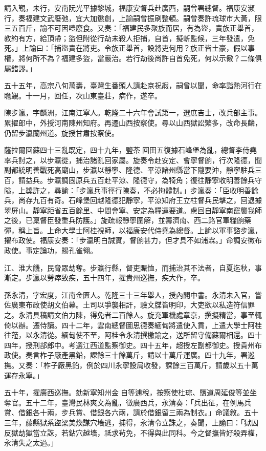 \begin{pinyinscope}
請入覲，未行，安南阮光平據黎城，福康安督兵赴廣西，嗣曾署總督。福康安瀕行，奏福建文武廢弛，宜大加懲創，上諭嗣曾振刷整頓。嗣曾奏許琉球市大黃，限三五百斤，諭不可因噎廢食。又奏：「福建民多聚族而居，有為盜，責族正舉首，教約有方，給頂帶；盜但附從行劫未殺人拒捕，自首，擬斬監候，三年發遣，免死。」上諭曰：「捕盜責在將吏。令族正舉首，設將吏何用？族正皆土豪，假以事權，將何所不為？福建多盜，當嚴治。若行劫後尚許自首免死，何以示儆？二條俱屬錯謬。」

五十五年，高宗八旬萬壽，臺灣生番頭人請赴京祝嘏，嗣曾以聞，命率詣熱河行在瞻覲。十一月，回任，次山東臺莊，病作，遂卒。

陳步瀛，字麟洲，江南江寧人。乾隆二十六年會試第一，選庶吉士，改兵部主事。累擢郎中，外授河南陳州知府。再遷山西按察使。尋以山西獄訟繁多，改命長麟，仍留步瀛蘭州道。旋授甘肅按察使。

薩拉爾回蘇四十三亂既定，四十九年，鹽茶回田五復據石峰堡為亂，總督李侍堯率兵討之，以步瀛從，捕治諸亂回家屬。旋奏令赴安定、會寧督餉，行次隆德，聞副都統明善戰死高廟山，步瀛以靜寧、隆德、平涼諸州縣當下隴要沖，靜寧駐兵三百，請益兵。步瀛調固原兵五百赴平涼、隆德守，為犄角；復往靜寧收明善餘兵守隘，上獎許之，尋諭：「步瀛兵事徑行陳奏，不必拘體制。」步瀛奏：「臣收明善餘兵，尚存九百有奇。石峰堡回越隆德犯靜寧，平涼知府王立柱督兵民擊之，回退據翠屏山。靜寧距省五百餘里、中間會寧、安定為糧運要道。慮回自靜寧南竄襲我師之後，已稟督臣發重兵防護。」旋疏報靜寧圍解，並籌濟南、西二路官軍糧餉藥彈，稱上旨。上命大學士阿桂視師，以福康安代侍堯為總督。上諭以軍事諮步瀛，擢布政使。福康安奏：「步瀛明白誠實，督餉甚力，但才具不如浦霖。」命調安徽布政使。事定論功，賜孔雀翎。

江、淮大饑，民脅眾劫奪。步瀛行縣，督吏賑恤，而捕治其不法者，自夏迄秋，事漸定。步瀛以勞瘁致疾，五十四年，擢貴州巡撫，疾大作，卒。

孫永清，字宏度，江南金匱人。乾隆三十三年舉人，授內閣中書。永清未入官，嘗佐廣東布政使胡文伯幕。土司以爭襲相訐，驗文牒皆明印，大吏欲以私造符信罪之。永清具稿請文伯力陳，得免者二百餘人。旋充軍機處章京，撰擬精當，事至輒倚以辦。遷侍讀。四十二年，雲南總督圖思德奏緬甸將遣使入貢，上遣大學士阿桂往蒞，以永清從。緬甸使不至，阿桂令永清撰檄諭之，送所留守備蘇爾相還。四十四年，授刑部郎中。考選江西道監察御史。四十五年，超授左副都御史。授貴州布政使。奏言柞子廠產黑鉛，課餘三十餘萬斤，請以十萬斤運廣。四十九年，署巡撫。又奏：「柞子廠黑鉛，例於四川永寧設局收發，課餘三百萬斤，請歲以五十萬運存永寧。」

五十年，擢廣西巡撫。劾新寧知州金自等逋稅，按察使杜琮、鹽道周延俊等並坐奪官。五十二年，臺灣民林爽文為亂，徵廣西兵，永清奏：「兵出征，在例馬兵賞、借銀各十兩，步兵賞、借銀各六兩，請於借銀留三兩為制衣。」命議敘。五十三年，藤縣獄系盜梁美煥謀穴墻逃，捕得，永清令立誅之，奏聞，上諭曰：「獄囚反獄劫獄當立誅，若鉆穴越墻，祗求茍免，不得與此同科。今之督撫皆好殺弄權，永清失之太過。」


\end{pinyinscope}
